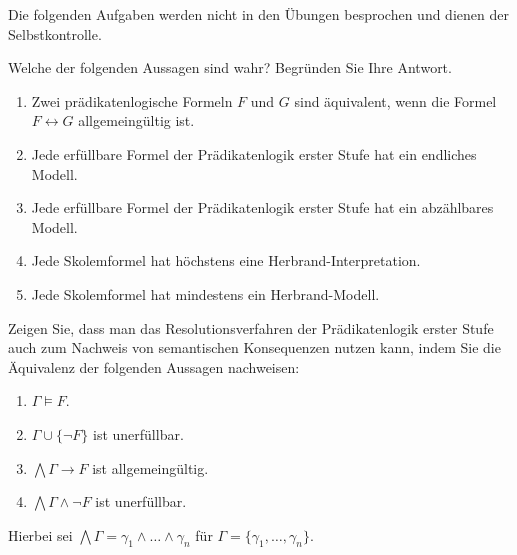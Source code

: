 \documentclass[german]{latteachCD}[2017/03/28]
\begin{document}
\maketitle

\begin{mdframed}
  Die folgenden Aufgaben werden nicht in den Übungen besprochen und dienen der
  Selbstkontrolle.

  \renewcommand{\theexercise}{\Roman{exercise}}
  \setcounter{exercise}{5}

  \begin{exercise}
    Welche der folgenden Aussagen sind wahr?  Begründen Sie Ihre Antwort.
    \begin{enumerate}
    \item Zwei prädikatenlogische Formeln $F$ und $G$ sind äquivalent, wenn die
      Formel $F \leftrightarrow G$ allgemeingültig ist.
    \item Jede erfüllbare Formel der Prädikatenlogik erster Stufe hat ein
      endliches Modell.
    \item Jede erfüllbare Formel der Prädikatenlogik erster Stufe hat ein
      abzählbares Modell.
    \item Jede Skolemformel hat höchstens eine Herbrand-Interpretation.
    \item Jede Skolemformel hat mindestens ein Herbrand-Modell.
    \end{enumerate}
  \end{exercise}

  \begin{exercise}
    Zeigen Sie, dass man das Resolutionsverfahren der Prädikatenlogik erster Stufe
    auch zum Nachweis von semantischen Konsequenzen nutzen kann, indem Sie die
    Äquivalenz der folgenden Aussagen nachweisen:
    \begin{enumerate}
    \item $\Gamma \models F$.
    \item $\Gamma \cup \{\neg F\}$ ist unerfüllbar.
    \item $\bigwedge \Gamma \to F$ ist allgemeingültig.
    \item $\bigwedge \Gamma \land \neg F$ ist unerfüllbar.
    \end{enumerate}
    Hierbei sei $\bigwedge \Gamma = \gamma_{1} \land \dots \land \gamma_{n}$ für
    $\Gamma = \{\gamma_{1},\ldots,\gamma_{n}\}$.
  \end{exercise}
\end{mdframed}
\end{document}
